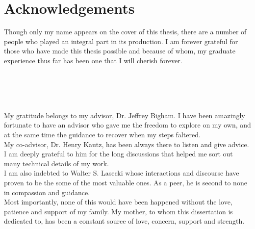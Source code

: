 \newpage                                             \chapter{Acknowledgements}

Though only my name appears on the cover of this thesis, there are a number of
people who played an integral part in its production. I am forever grateful for
those  who have made this thesis possible and because of whom, my graduate
experience thus far has been one that I will cherish forever.\\\\\\\\\


My gratitude belongs to my advisor, Dr. Jeffrey Bigham. I have been amazingly
fortunate to have an advisor who gave me the freedom to explore on my own, and
at the same time the guidance to recover when my steps faltered.\\


My co-advisor, Dr. Henry Kautz, has been always there to listen and give advice.
I am deeply grateful to him for the long discussions that helped me sort out
many technical details of my work.\\

I am also indebted to Walter S. Lasecki whose interactions and discourse have
proven to be the some of the most valuable ones.  As a peer, he is second to
none in compassion and guidance.\\

Most importantly, none of this would have been happened without the love,
patience and support of my family. My mother, to whom this dissertation is
dedicated to, has been a constant source of love, concern, support and strength.
